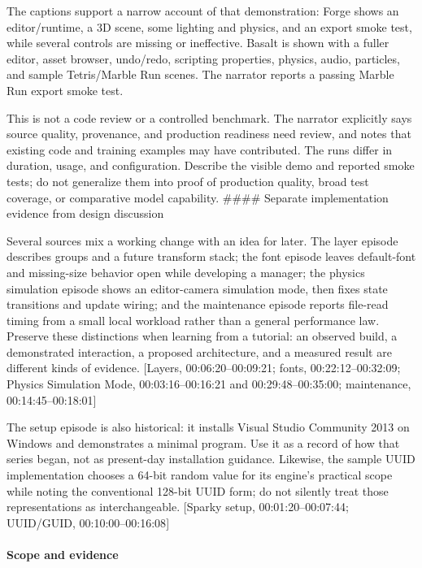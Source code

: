 The captions support a narrow account of that demonstration: Forge shows an editor/runtime, a 3D scene, some lighting and physics, and an export smoke test, while several controls are missing or ineffective. Basalt is shown with a fuller editor, asset browser, undo/redo, scripting properties, physics, audio, particles, and sample Tetris/Marble Run scenes. The narrator reports a passing Marble Run export smoke test.

This is not a code review or a controlled benchmark. The narrator explicitly says source quality, provenance, and production readiness need review, and notes that existing code and training examples may have contributed. The runs differ in duration, usage, and configuration. Describe the visible demo and reported smoke tests; do not generalize them into proof of production quality, broad test coverage, or comparative model capability. \#\#\#\# Separate implementation evidence from design discussion

Several sources mix a working change with an idea for later. The layer episode describes groups and a future transform stack; the font episode leaves default-font and missing-size behavior open while developing a manager; the physics simulation episode shows an editor-camera simulation mode, then fixes state transitions and update wiring; and the maintenance episode reports file-read timing from a small local workload rather than a general performance law. Preserve these distinctions when learning from a tutorial: an observed build, a demonstrated interaction, a proposed architecture, and a measured result are different kinds of evidence. {[}Layers, 00:06:20--00:09:21; fonts, 00:22:12--00:32:09; Physics Simulation Mode, 00:03:16--00:16:21 and 00:29:48--00:35:00; maintenance, 00:14:45--00:18:01{]}

The setup episode is also historical: it installs Visual Studio Community 2013 on Windows and demonstrates a minimal program. Use it as a record of how that series began, not as present-day installation guidance. Likewise, the sample UUID implementation chooses a 64-bit random value for its engine's practical scope while noting the conventional 128-bit UUID form; do not silently treat those representations as interchangeable. {[}Sparky setup, 00:01:20--00:07:44; UUID/GUID, 00:10:00--00:16:08{]}

\paragraph{Scope and evidence}\label{scope-and-evidence}

